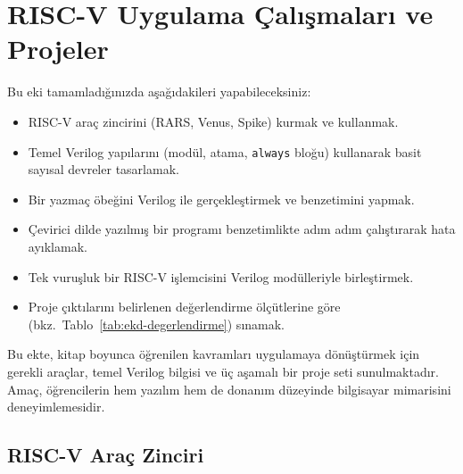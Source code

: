 \chapter{RISC-V Uygulama Çalışmaları ve Projeler}
\label{app:pratik-rehber}

\begin{tcolorbox}[
    colback=blokyesil!15,
    colframe=sinyalyesil!60!black,
    title={\textbf{Öğrenme Hedefleri}},
    fonttitle=\bfseries,
    rounded corners,
    boxrule=0.8pt
]
Bu eki tamamladığınızda aşağıdakileri yapabileceksiniz:
\begin{itemize}[nosep, leftmargin=*]
    \item RISC-V araç zincirini (RARS, Venus, Spike) kurmak ve kullanmak.
    \item Temel Verilog yapılarını (modül, atama, \texttt{always} bloğu) kullanarak basit sayısal devreler tasarlamak.
    \item Bir yazmaç öbeğini Verilog ile gerçekleştirmek ve benzetimini yapmak.
    \item Çevirici dilde yazılmış bir programı benzetimlikte adım adım çalıştırarak hata ayıklamak.
    \item Tek vuruşluk bir RISC-V işlemcisini Verilog modülleriyle birleştirmek.
    \item Proje çıktılarını belirlenen değerlendirme ölçütlerine göre (bkz.\ Tablo~\ref{tab:ekd-degerlendirme}) sınamak.
\end{itemize}
\end{tcolorbox}

Bu ekte, kitap boyunca öğrenilen kavramları uygulamaya dönüştürmek için gerekli araçlar, temel Verilog bilgisi ve üç aşamalı bir proje seti sunulmaktadır. Amaç, öğrencilerin hem yazılım hem de donanım düzeyinde bilgisayar mimarisini deneyimlemesidir.

\section{RISC-V Araç Zinciri}
\label{sec:ekd-arac-zinciri}

